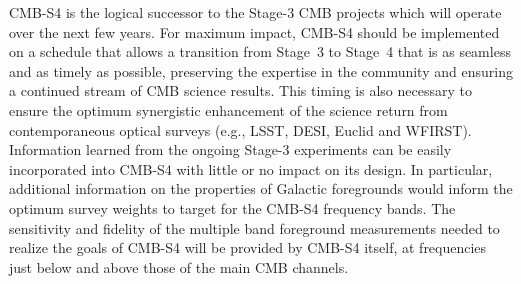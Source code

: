 %


CMB-S4 is the logical successor to the Stage-3 CMB projects which will operate over the next few years. For maximum impact, CMB-S4 should be implemented on a schedule that allows a transition from Stage~3 to Stage~4 that is as seamless and as timely as possible, preserving the expertise in the community and ensuring a continued stream of CMB science results. This timing is also necessary to ensure the optimum synergistic enhancement of the science return from contemporaneous optical surveys (e.g., LSST, DESI, Euclid and WFIRST).   Information learned from the ongoing Stage-3 experiments can be easily incorporated into CMB-S4 with little or no impact on its design. In particular, additional information on the properties of Galactic foregrounds would inform the optimum survey weights to target for the CMB-S4 frequency bands.  The sensitivity and fidelity of the multiple band foreground measurements needed to realize the goals of CMB-S4 will be provided by CMB-S4 itself, at frequencies just below and above those of the main CMB channels. 

